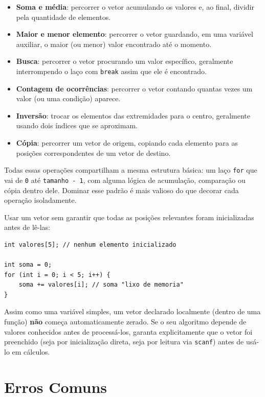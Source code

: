 \begin{itemize}
    \item \textbf{Soma e média}: percorrer o vetor acumulando os valores e, ao final, dividir pela quantidade de elementos.
    \item \textbf{Maior e menor elemento}: percorrer o vetor guardando, em uma variável auxiliar, o maior (ou menor) valor encontrado até o momento.
    \item \textbf{Busca}: percorrer o vetor procurando um valor específico, geralmente interrompendo o laço com \texttt{break} assim que ele é encontrado.
    \item \textbf{Contagem de ocorrências}: percorrer o vetor contando quantas vezes um valor (ou uma condição) aparece.
    \item \textbf{Inversão}: trocar os elementos das extremidades para o centro, geralmente usando dois índices que se aproximam.
    \item \textbf{Cópia}: percorrer um vetor de origem, copiando cada elemento para as posições correspondentes de um vetor de destino.
\end{itemize}

Todas essas operações compartilham a mesma estrutura básica: um laço \texttt{for} que vai de \texttt{0} até \texttt{tamanho - 1}, com alguma lógica de acumulação, comparação ou cópia dentro dele. Dominar esse padrão é mais valioso do que decorar cada operação isoladamente.

\begin{errocomum}
Usar um vetor sem garantir que todas as posições relevantes foram inicializadas antes de lê-las:
\begin{lstlisting}
int valores[5]; // nenhum elemento inicializado

int soma = 0;
for (int i = 0; i < 5; i++) {
    soma += valores[i]; // soma "lixo de memoria"
}
\end{lstlisting}
Assim como uma variável simples, um vetor declarado localmente (dentro de uma função) \textbf{não} começa automaticamente zerado. Se o seu algoritmo depende de valores conhecidos antes de processá-los, garanta explicitamente que o vetor foi preenchido (seja por inicialização direta, seja por leitura via \texttt{scanf}) antes de usá-lo em cálculos.
\end{errocomum}

\section{Erros Comuns}

